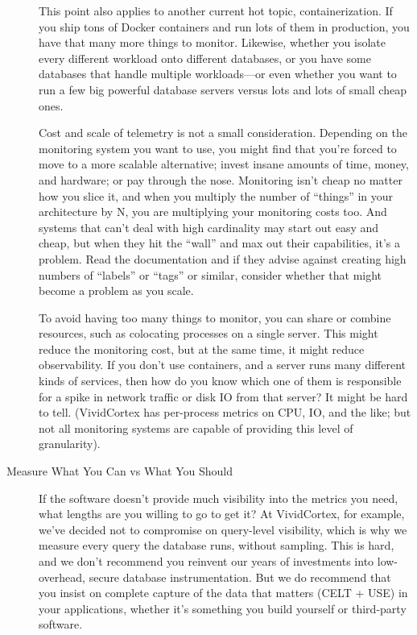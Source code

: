\documentclass{vivid_layout}
\begin{document}
\begin{description}
This point also applies to another current hot topic, containerization. If you
ship tons of Docker containers and run lots of them in production, you have that
many more things to monitor. Likewise, whether you isolate every different
workload onto different databases, or you have some databases that handle
multiple workloads---or even whether you want to run a few big powerful database
servers versus lots and lots of small cheap ones.

Cost and scale of telemetry is not a small consideration. Depending on the monitoring system you want
to use, you might find that you're forced to move to a more scalable
alternative; invest insane amounts of time, money, and hardware; or pay
through the nose. Monitoring isn't cheap no matter how you slice it, and when
you multiply the number of ``things'' in your architecture by N, you 
are multiplying your monitoring costs too. And systems that can't deal with high cardinality may start out easy and cheap, but when they hit the ``wall'' and max out their capabilities, it's a problem. Read the documentation and if they advise against creating high numbers of ``labels'' or ``tags'' or similar, consider whether that might become a problem as you scale.

To avoid having too many things to monitor, you can share or combine resources, such as colocating processes on a single server. This might reduce the monitoring cost, but
at the same time, it might reduce observability. If you don't use containers, and a
server runs many different kinds of services, then how do you know which one of them is
responsible for a spike in network traffic or disk IO from that server? It might
be hard to tell. (VividCortex has per-process metrics on CPU, IO, and the like;
but not all monitoring systems are capable of providing this level of
granularity).

\item[Measure What You Can vs What You Should] If the software doesn't provide
much visibility into the metrics you need, what lengths are you willing
to go to get it? At VividCortex, for example, we've decided not to compromise on
query-level visibility, which is why we
measure every query the database runs, without sampling.
This is hard, and we don't recommend you reinvent our years of investments into low-overhead, secure database instrumentation. But we do recommend that you insist on complete capture of the data that matters (CELT + USE) in your applications, whether it's something you build yourself or third-party software.

\end{description}
\end{document}
